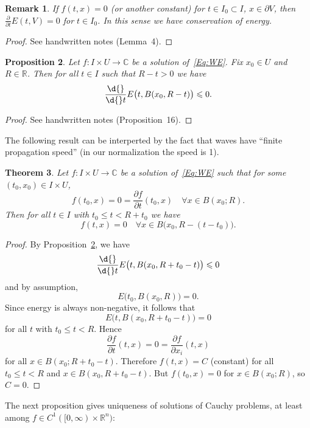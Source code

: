 \documentclass[12pt, oneside, a4paper]{article}
\newtheorem{thm}{Theorem}[section]
\newtheorem{prop}[thm]{Proposition}
\theoremstyle{dfn}
\newtheorem{rem}[thm]{Remark}
\def\Rbb{\ensuremath{\mathbb{R}}}
\newcommand{\Com}{\mathbb{C}}
\begin{document}
\begin{rem}
If $f(t,x) = 0$ (or another constant) for $t \in I_0 \subset I$, $x \in \partial V$, then $\frac{\partial}{\partial t} E(t,V) = 0$ for $t \in I_0$. In this sense we have conservation of energy.
\end{rem}

\begin{proof}
See handwritten notes (Lemma~4).
\end{proof}

\begin{prop}\label{Prop:WE:EnergyNonIncreasing}
Let $f \colon I \times U \to \Com$ be a solution of~\eqref{Eq:WE}. Fix $x_0 \in U$ and $R \in \Rbb$. Then for all $t \in I$ such that $R-t > 0$ we have
\[
\frac{\d{}}{\d{}t} E \big(t, B(x_0,R-t) \big) \leqslant 0.
\]
\end{prop}

\begin{proof}
See handwritten notes (Proposition~16).
\end{proof}

The following result can be interperted by the fact that waves have ``finite propagation speed'' (in our normalization the speed is 1).

\begin{thm}\label{Theo:FinitePropagationSpeed}
Let $f \colon I \times U \to \Com$ be a solution of~\eqref{Eq:WE} such that for some $(t_0,x_0) \in I \times U$,
\[
f(t_0,x) = 0 = \frac{\partial f}{\partial t}(t_0,x) \quad \forall x \in B(x_0;R).
\]
Then for all $t \in I$ with $t_0 \leqslant t < R + t_0$ we have
\[
f(t,x) = 0 \quad \forall x \in B \big(x_0, R - (t-t_0) \big).
\]
\end{thm}

\begin{proof}
By Proposition~\ref{Prop:WE:EnergyNonIncreasing}, we have
\[
\frac{\d{}}{\d{}t} E\big( t, B(x_0, R + t_0 - t) \big) \leqslant 0
\]
and by assumption,
\[
E\big(t_0, B(x_0,R)\big) = 0.
\]
Since energy is always non-negative, it follows that
\[
E \big( t, B(x_0, R + t_0 - t) \big) = 0
\]
for all $t$ with $t_0 \leqslant t < R$. Hence
\[
\frac{\partial f}{\partial t}(t,x) = 0 = \frac{\partial f}{\partial x_i}(t,x)
\]
for all $x \in B(x_0; R + t_0 - t)$. Therefore $f(t,x) = C$ (constant) for all $t_0 \leqslant t < R$ and $x \in B(x_0, R + t_0 - t)$. But $f(t_0,x) = 0$ for $x \in B(x_0;R)$, so $C = 0$.
\end{proof}

The next proposition gives uniqueness of solutions of Cauchy problems, at least among $f \in C^1([0,\infty) \times \Rbb^n)$:
\end{document}
